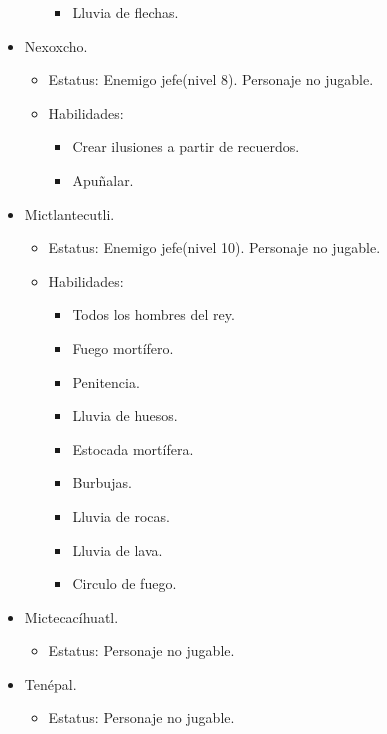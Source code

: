 \begin{itemize}
\begin{itemize}
\begin{itemize}
						\item Lluvia de flechas.
					\end{itemize}
			\end{itemize}
		\item Nexoxcho.
			\begin{itemize}
				\item Estatus: Enemigo jefe(nivel 8). Personaje no jugable.
				\item Habilidades: 
					\begin{itemize}
						\item Crear ilusiones a partir de recuerdos.
						\item Apuñalar.
					\end{itemize}
			\end{itemize}
		\item Mictlantecutli.
			\begin{itemize}
				\item Estatus: Enemigo jefe(nivel 10). Personaje no jugable.
				\item Habilidades: 
					\begin{itemize}
						\item Todos los hombres del rey.
						\item Fuego mortífero.
						\item Penitencia.
						\item Lluvia de huesos.
						\item Estocada mortífera.
						\item Burbujas.
						\item Lluvia de rocas.
						\item Lluvia de lava.
						\item Circulo de fuego.					
					\end{itemize}
			\end{itemize}
		\item Mictecacíhuatl.
			\begin{itemize}
				\item Estatus: Personaje no jugable.		
			\end{itemize}
		\item Tenépal.
			\begin{itemize}
				\item Estatus: Personaje no jugable.		
			\end{itemize}

\end{itemize}
